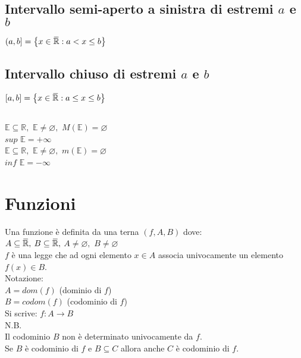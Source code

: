 \documentclass[a4paper, twoside, italian, 11pt]{book}
\newcommand{\braces}[1] {\left\{#1\right\}}
\newcommand{\overbar}[1]{\mkern 1.5mu\overline{\mkern-1.5mu#1\mkern-1.5mu}\mkern 1.5mu}
\newcommand{\R}{\mathbb{R}}
\newcommand{\E}{\mathbb{E}}
\let\emptyset\varnothing
\begin{document}
\subsection{Intervallo semi-aperto a sinistra di estremi $a$ e $b$}

\noindent
$(a, b] = \braces{ x \in \overbar \R : a < x \leq b}$ \\


\subsection{Intervallo chiuso di estremi $a$ e $b$}

\noindent
$[a, b] = \braces{ x \in \overbar \R : a \leq x \leq b}$ \\


\subsection{}

\noindent
$\E \subseteq \R,$ $\E \neq \emptyset,$ $M(\E) = \emptyset$ \\
$sup$ $\E = +\infty$ \\

\noindent
$\E \subseteq \R,$ $\E \neq \emptyset,$ $m(\E) = \emptyset$ \\
$inf$ $\E = -\infty$



\section{Funzioni}

\noindent
Una funzione è definita da una terna $(f, A, B)$ dove: \\

\noindent
$A \subseteq \overbar \R,$ $B \subseteq \overbar \R,$ $A \neq \emptyset,$ $B \neq \emptyset$ \\
$f$ è una legge che ad ogni elemento $x \in A$ associa univocamente un elemento $f(x) \in B$. \\

\noindent
Notazione: \\
$A = dom(f)$ (dominio di $f$) \\
$B = codom(f)$ (codominio di $f$) \\

\noindent
Si scrive: $f : A \rightarrow B$ \\

\noindent
N.B. \\
Il codominio $B$ non è determinato univocamente da $f$. \\
Se $B$ è codominio di $f$ e $B \subseteq C$ allora anche $C$ è codominio di $f$. \\
\end{document}

